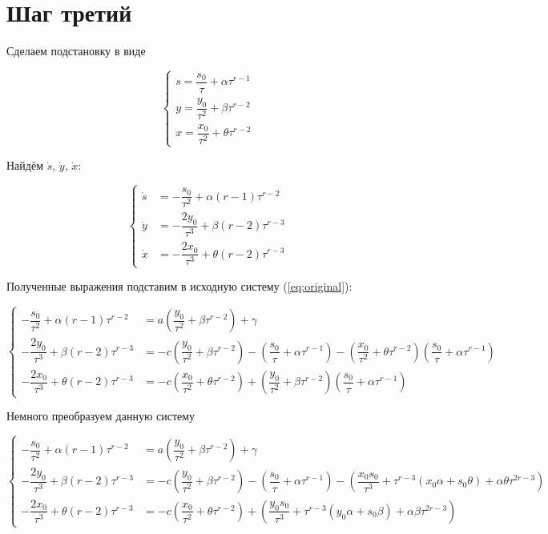 \section{Шаг третий}

Сделаем подстановку в виде

$$
	\left\{
		\begin{aligned}
			s = \dfrac{s_0}{\tau} + \alpha \tau^{r-1} \\
			y = \dfrac{y_0}{\tau^2} + \beta \tau^{r-2} \\
			x = \dfrac{x_0}{\tau^2} + \theta \tau^{r-2} 
		\end{aligned}
	\right.
$$

Найдём $ \dot s $, $ \dot y $, $ \dot x $:

$$
	\left\{
		\begin{aligned}
			\dot s &= -\dfrac{s_0}{\tau^{2}} + \alpha (r-1) \tau^{r-2} \\
			\dot y &= -\dfrac{2y_0}{\tau^{3}} + \beta (r-2) \tau^{r-3} \\
			\dot x &= -\dfrac{2x_0}{\tau^{3}} + \theta (r-2) \tau^{r-3}
		\end{aligned}
	\right.
$$

Полученные выражения подставим в исходную систему (\ref{eq:original}):

\begin{equation}
\label{eq:step3}
	\left\{
		\begin{aligned}
			-\dfrac{s_0}{\tau^{2}} + \alpha (r-1) \tau^{r-2} &= a \left( \dfrac{y_0}{\tau^2} + \beta \tau^{r-2} \right) + \gamma \\
			-\dfrac{2y_0}{\tau^{3}} + \beta (r-2) \tau^{r-3} &= -c \left( \dfrac{y_0}{\tau^2} + \beta \tau^{r-2} \right) - \left( \dfrac{s_0}{\tau} + \alpha \tau^{r-1} \right) - \left( \dfrac{x_0}{\tau^2} + \theta \tau^{r-2} \right) \left( \dfrac{s_0}{\tau} + \alpha \tau^{r-1} \right) \\
			-\dfrac{2x_0}{\tau^{3}} + \theta (r-2) \tau^{r-3} &= -c \left( \dfrac{x_0}{\tau^2} + \theta \tau^{r-2} \right) + \left( \dfrac{y_0}{\tau^2} + \beta \tau^{r-2} \right) \left( \dfrac{s_0}{\tau} + \alpha \tau^{r-1} \right)
		\end{aligned}
	\right.
\end{equation}

Немного преобразуем данную систему

$$
	\left\{
		\begin{aligned}
			-\dfrac{s_0}{\tau^{2}} + \alpha (r-1) \tau^{r-2} &= a \left( \dfrac{y_0}{\tau^2} + \beta \tau^{r-2} \right) + \gamma \\
			-\dfrac{2y_0}{\tau^{3}} + \beta (r-2) \tau^{r-3} &= -c \left( \dfrac{y_0}{\tau^2} + \beta \tau^{r-2} \right) - \left( \dfrac{s_0}{\tau} + \alpha \tau^{r-1} \right) - \left( \dfrac{x_0s_0}{\tau^3} + \tau^{r-3}(x_0\alpha + s_0\theta) + \alpha\theta\tau^{2r-3} \right) \\
			-\dfrac{2x_0}{\tau^{3}} + \theta (r-2) \tau^{r-3} &= -c \left( \dfrac{x_0}{\tau^2} + \theta \tau^{r-2} \right) + \left( \dfrac{y_0s_0}{\tau^3} + \tau^{r-3}(y_0\alpha + s_0\beta) + \alpha\beta\tau^{2r-3} \right)
		\end{aligned}
	\right.
$$

